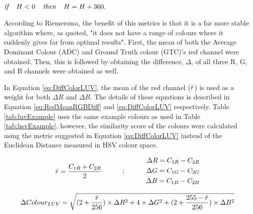 \centerline{\\$\textit{if } \hspace{.8em}H< 0 \hspace{.8em}\textit{ then } \hspace{.8em}H = H+360.$}











According to Riemersma, the benefit of this metrics is that it is a far more stable algorithm where, as quoted, "it does not have a range of colours where it suddenly gives far from optimal results". First, the mean of both the Average Dominant Colour (ADC) and Ground Truth colour (GTC)'s red channel were obtained. Then, this is followed by obtaining the difference, $\Delta$, of all three R, G, and B channels were obtained as well.

In Equation \ref{eq:DiffColorLUV}, the mean of the red channel ($\bar{r}$) is used as a weight for both $\Delta{R}$ and $\Delta{B}$. The details of these equations is described in Equation \ref{eq:RedMeanRGBDiff} and \ref{eq:DiffColorLUV} respectively. Table \ref{tab:luvExample} uses the same example colours as used in Table \ref{tab:hsvExample}, however, the similarity score of the colours were calculated using the metric suggested in Equation \ref{eq:DiffColorLUV} instead of the Euclidean Distance measured in HSV colour space.


\begin{equation}
\begin{split}
\label{eq:RedMeanRGBDiff}
\bar{r} = \frac{C_{1R} + C_{2R}}{2}
\end{split}
\quad\quad\quad ; \quad\quad\quad
 \begin{split}
\Delta R = C_{1R} - C_{2R}\\
\Delta G = C_{1G} - C_{2G}\\
\Delta B = C_{1B} - C_{2B}
 \end{split}
\end{equation}

\begin{equation}
\label{eq:DiffColorLUV}
\Delta Colour_{LUV} = \sqrt{(2 + \frac{\bar{r}}{256}) \times \Delta R^{2} + 4 \times \Delta G^{2} + (2 + \frac{255 - \bar{r}}{256}) \times \Delta B^{2} }
\end{equation}





